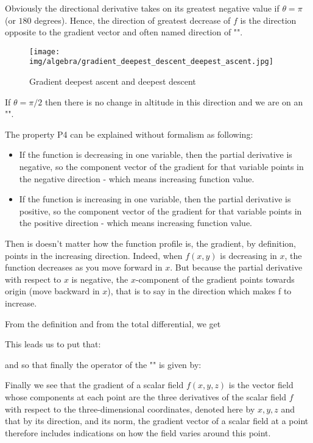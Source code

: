 	Obviously the directional derivative takes on its greatest negative value if $\theta=\pi$ (or $180$ degrees). Hence, the direction of greatest decrease of $f$ is the direction opposite to the gradient vector and often named direction of "\label{eepest descent}".
	\begin{figure}[H]
		\centering
		\texttt{[image: img/algebra/gradient\_deepest\_descent\_deepest\_ascent.jpg]}
		\caption{Gradient deepest ascent and deepest descent}
	\end{figure}
	If $\theta=\pi/2$ then there is no change in altitude in this direction and we are on an "".
	
	The property P4 can be explained without formalism as following:
	\begin{itemize}
		\item If the function is decreasing in one variable, then the partial derivative is negative, so the component vector of the gradient for that variable points in the negative direction - which means increasing function value.

		\item If the function is increasing in one variable, then the partial derivative is positive, so the component vector of the gradient for that variable points in the positive direction - which means increasing function value.
	\end{itemize}
	Then is doesn't matter how the function profile is, the gradient, by definition, points in the increasing direction. Indeed, when 	
$f(x,y)$ is decreasing in $x$, the function decreases as you move forward in $x$. But because the partial derivative with respect to $x$ is negative, the $x$-component of the gradient points towards origin (move backward in $x$), that is to say in the direction which makes f to increase.
	
	From the definition and from the total differential, we get
	
	This leads us to put that:
	
	and so that finally the operator of the "" is given by:
	
	Finally we see that the gradient of a scalar field $f(x,y,z)$ is the vector field whose components at each point are the three derivatives of the scalar field $f$ with respect to the three-dimensional coordinates, denoted here by $x, y, z$ and that by its direction, and its norm, the gradient vector of a scalar field at a point therefore includes indications on how the field varies around this point.
	
